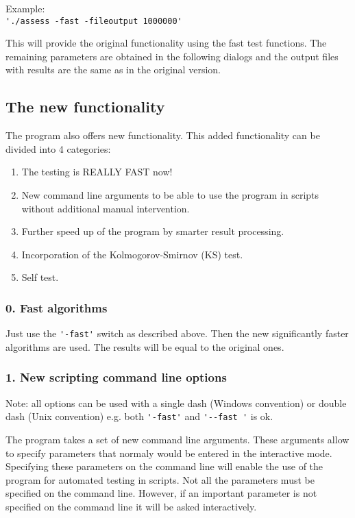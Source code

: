 \documentclass[12pt]{article}
\begin{document}
\bigskip
Example:\\
\verb|'./assess -fast -fileoutput 1000000'|

\smallskip
This will provide the original functionality using the fast test functions. The remaining parameters are obtained in the following dialogs and the output files with results are the same as in the original version.

\subsection*{The new functionality}
The program also offers new functionality. This added functionality can be divided into 4 categories:

\begin{enumerate}
\setlength\itemsep{-3pt}
\setcounter{enumi}{-1}
\item The testing is REALLY FAST now!
\item New command line arguments to be able to use the program in scripts without additional manual intervention.
\item Further speed up of the program by smarter result processing.
\item Incorporation of the Kolmogorov-Smirnov (KS) test.
\item Self test.
\end{enumerate}

\subsubsection*{0. Fast algorithms}
Just use the \verb|'-fast'| switch as described above. Then the new significantly faster algorithms are used. The results will be equal to the original ones.
\subsubsection*{1. New scripting command line options}
Note: all options can be used with a single dash (Windows convention) or double dash (Unix convention) e.g. both \verb|'-fast'| and \verb|'--fast '| is ok.

The program takes a set of new command line arguments. These arguments allow to specify parameters that normaly would be entered in the interactive mode. Specifying these parameters on the command line will enable the use of the program for automated testing in scripts. Not all the parameters must be specified on the command line. However, if an important parameter is not specified on the command line it will be asked interactively.
\end{document}
